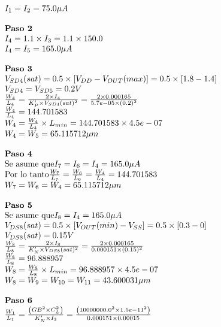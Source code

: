 \begin{equation}
\begin{array}{l l}
		I_{1} = I_{2} =  75.0 \mu A \\
		\\
		\textbf{Paso 2} \\
		I_{4} = 1.1 \times I_{3} = 1.1 \times 150.0  \\
		I_{4} = I_{5} =  165.0 \mu A \\
		\\
		\textbf{Paso 3} \\
		V_{SD4}(sat) = 0.5 \times \left[ V_{DD} - V_{OUT}(max) \right] = 0.5 \times \left[  1.8  -  1.4  \right] \\
		V_{SD4} = V_{SD5} =  0.2  V \\
		\frac{W_4}{L_4} = \frac{2\times I_{4}}{K'_{P}\times V_{SD4}(sat)^2} = \frac{2\times 0.000165 }{ 5.7e-05 \times ( 0.2 )^2} \\
		\frac{W_4}{L_4} =  144.701583  \\
		W_{4} = \frac{W_4}{L_4} \times L_{min} =  144.701583 \times 4.5e-07  \\
		W_{4} = W_{5} =  65.115712  \mu m \\
		\\
		\textbf{Paso 4} \\
		\text{Se asume que} I_{7} = I_{6} = I_{4} =  165.0 \mu A \\
		\text{Por lo tanto} \frac{W_7}{L_7} = \frac{W_6}{L_6} = \frac{W_4}{L_4} =  144.701583  \\
		W_{7} = W_{6} = W_{4} =  65.115712  \mu m \\
		\\
		\textbf{Paso 5} \\
		\text{Se asume que} I_{8} = I_{4} =  165.0 \mu A \\
		V_{DS8}(sat) = 0.5 \times \left[ V_{OUT}(min) - V_{SS} \right] = 0.5 \times \left[  0.3  -  0  \right] \\
		V_{DS8}(sat) =  0.15  V \\
		\frac{W_8}{L_8} = \frac{2\times I_{8}}{K'_{N}\times V_{DS8}(sat)^2} = \frac{2\times 0.000165 }{ 0.000151 \times ( 0.15 )^2} \\
		\frac{W_8}{L_8} =  96.888957  \\
		W_{8} = \frac{W_8}{L_8} \times L_{min} =  96.888957 \times 4.5e-07  \\
		W_{8} = W_{9} = W_{10} = W_{11} =  43.600031  \mu m \\
		\\
		\textbf{Paso 6} \\
		\frac{W_1}{L_1} = \frac{\left( GB^2 \times C_{L}^2 \right)}{K'_{N} \times I_{3}} = \frac{\left(  10000000.0 ^2 \times  1.5e-11 ^2 \right)}{ 0.000151  \times  0.00015 } \\

\end{array}
\end{equation}
